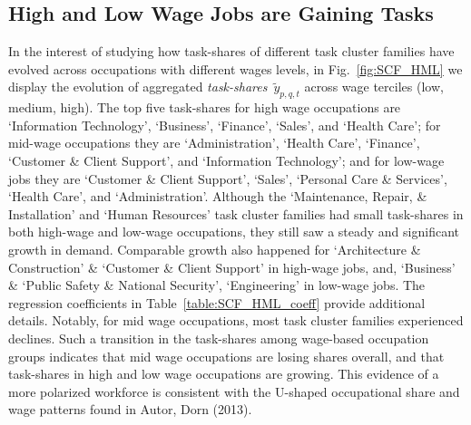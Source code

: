 \documentclass[letterpaper]{article} %
\begin{document}
\subsection{High and Low Wage Jobs are Gaining Tasks}
\label{subsec:mid_wage}
In the interest of studying how task-shares of different task cluster families have evolved across occupations with different wages levels, in Fig.~\ref{fig:SCF_HML} we display the evolution of aggregated \emph{task-shares}~$\tilde{y}_{p,q,t}$ across wage terciles (low, medium, high). The top five task-shares for high wage occupations are `Information Technology', `Business', `Finance', `Sales', and `Health Care'; for mid-wage occupations they are `Administration', `Health Care', `Finance', `Customer \& Client Support', and `Information Technology'; and for low-wage jobs they are `Customer \& Client Support', `Sales', `Personal Care \& Services', `Health Care', and `Administration'. Although the `Maintenance, Repair, \& Installation' and `Human Resources' task cluster families had small task-shares in both high-wage and low-wage occupations, they still saw a steady and significant growth in demand. Comparable growth also happened for `Architecture \& Construction' \& `Customer \& Client Support' in high-wage jobs, and, `Business' \& `Public Safety \& National Security', `Engineering' in low-wage jobs. The regression coefficients in Table~\ref{table:SCF_HML_coeff} provide additional details. Notably, for mid wage occupations, most task cluster families experienced declines. Such a transition in the task-shares among wage-based occupation groups indicates that mid wage occupations are losing shares overall, and that task-shares in high and low wage occupations are growing. This evidence of a more polarized workforce is consistent with the U-shaped occupational share and wage patterns found in Autor, Dorn (2013).
\end{document}
